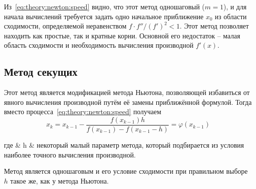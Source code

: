Из~\ref{eq:theory:newton:speed} видно, что этот метод одношаговый ($m=1$), и для начала вычислений требуется задать одно начальное приближение $x_0$ из области сходимости, определяемой неравенством $f\cdot f'' / (f')^2<1$.  Этот метод позволяет находить как простые, так и кратные корни. Основной его недостаток – малая область сходимости и необходимость вычисления производной $f'(x)$.

\subsection{Метод секущих}
Этот метод является модификацией метода Ньютона, позволяющей избавиться от явного вычисления производной путём её замены приближённой формулой. Тогда вместо процесса~\ref{eq:theory:newton:speed} получаем
\begin{equation}
	x_k=x_{k-1} -\frac{f(x_{k-1})h}{f(x_{k-1}) -f(x_{k-1} - h) }=\varphi(x_{k-1})
\end{equation}
\begin{explanation}
	где & h & некоторый малый параметр метода, который подбирается из условия наиболее точного вычисления производной.
\end{explanation}

Метод является одношаговым и его условие сходимости при правильном выборе $h$ такое же, как у метода Ньютона.